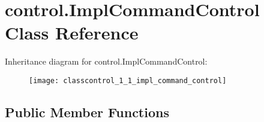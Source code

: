 \hypertarget{classcontrol_1_1_impl_command_control}{}\section{control.\+Impl\+Command\+Control Class Reference}
\label{classcontrol_1_1_impl_command_control}
Inheritance diagram for control.\+Impl\+Command\+Control\+:\begin{figure}[H]
\begin{center}
\leavevmode
\texttt{[image: classcontrol\_1\_1\_impl\_command\_control]}
\end{center}
\end{figure}
\subsection*{Public Member Functions}
